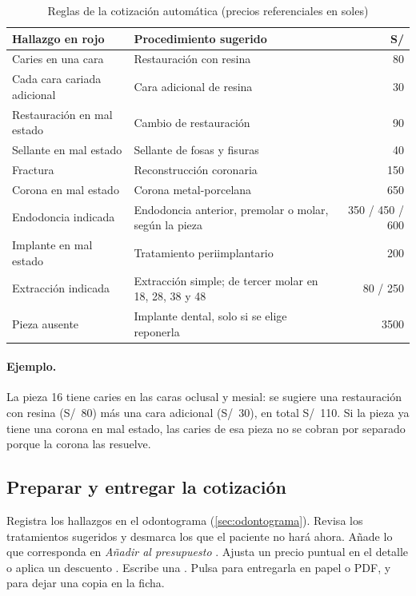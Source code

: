 \documentclass[11pt]{article}
\begin{document}
\begin{table}[H]
\centering\small
\caption{Reglas de la cotización automática (precios referenciales en soles)}\label{tab:reglas}
\begin{tabularx}{\linewidth}{@{}P{4.2cm}L r@{}}
\toprule
\textbf{Hallazgo en rojo} & \textbf{Procedimiento sugerido} & \textbf{S/} \\
\midrule
Caries en una cara & Restauración con resina & 80 \\
Cada cara cariada adicional & Cara adicional de resina & 30 \\
Restauración en mal estado & Cambio de restauración & 90 \\
Sellante en mal estado & Sellante de fosas y fisuras & 40 \\
Fractura & Reconstrucción coronaria & 150 \\
Corona en mal estado & Corona metal-porcelana & 650 \\
Endodoncia indicada & Endodoncia anterior, premolar o molar, según la pieza & 350 / 450 / 600 \\
Implante en mal estado & Tratamiento periimplantario & 200 \\
Extracción indicada & Extracción simple; de tercer molar en 18, 28, 38 y 48 & 80 / 250 \\
Pieza ausente & Implante dental, solo si se elige reponerla & 3500 \\
\bottomrule
\end{tabularx}
\end{table}

\paragraph{Ejemplo.} La pieza 16 tiene caries en las caras oclusal y mesial: se sugiere una restauración con resina (S/~80) más una cara adicional (S/~30), en total S/~110. Si la pieza ya tiene una corona en mal estado, las caries de esa pieza no se cobran por separado porque la corona las resuelve.

\subsection{Preparar y entregar la cotización}

\begin{pasos}
  \paso Registra los hallazgos en el odontograma (\cref{sec:odontograma}).
  \paso Revisa los tratamientos sugeridos  y desmarca los que el paciente no hará ahora.
  \paso Añade lo que corresponda en \textit{Añadir al presupuesto} .
  \paso Ajusta un precio puntual en el detalle  o aplica un descuento .
  \paso Escribe una  .
  \paso Pulsa  para entregarla en papel o PDF, y  para dejar una copia en la ficha.
\end{pasos}
\end{document}
